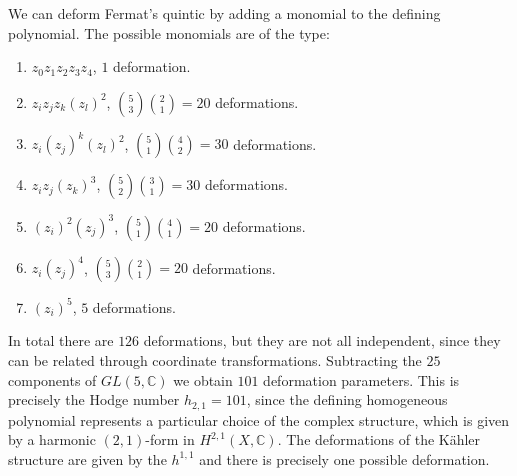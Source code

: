 We can deform Fermat's quintic by adding a monomial to the defining polynomial.
The possible monomials are of the type:
\begin{enumerate}
  \item $z_0z_1z_2z_3z_4$, $1$ deformation.
  \item $z_i z_j z_k(z_l)^2$, ${5}\choose{3}$${2}\choose{1}$$=20$ deformations. 
  \item $z_i(z_j)^k(z_l)^2$, ${5}\choose{1}$${4}\choose{2}$$=30$ deformations.
  \item $z_i z_j(z_k)^3$, ${5}\choose{2}$${3}\choose{1}$$=30$ deformations.
  \item $(z_i)^2(z_j)^3$, ${5}\choose{1}$${4}\choose{1}$$=20$ deformations.
  \item $z_i(z_j)^4$, ${5}\choose{3}$${2}\choose{1}$$=20$ deformations.
  \item $(z_i)^5$, $5$ deformations.
\end{enumerate}
In total there are $126$ deformations, but they are not all independent, since they 
can be related through coordinate transformations.
Subtracting the $25$ components of $GL(5,\mathbb C)$ we obtain $101$ deformation parameters.
This is precisely the Hodge number $h_{2,1}=101$, since the defining homogeneous polynomial  
represents a particular choice of the complex structure, which is given by a
harmonic $(2,1)$-form in $H^{2,1}(X,\mathbb C)$.
The deformations of the Kähler structure are given by the $h^{1,1}$ and there is precisely one possible deformation.

